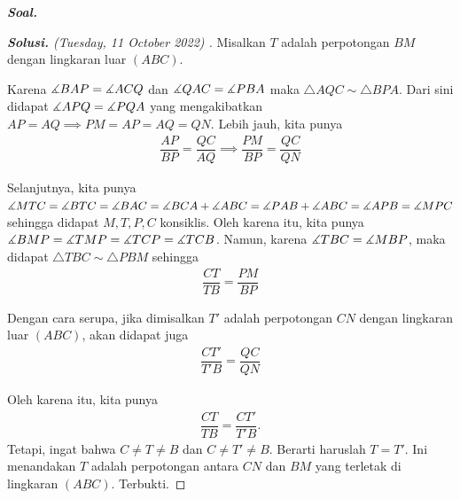 \textbf{\textit{Soal. }}

\begin{proof}[\textbf{Solusi. }(Tuesday, 11 October 2022) ]
Misalkan $T$ adalah perpotongan $BM$ dengan lingkaran luar $(ABC)$.
% 

Karena $\measuredangle BAP = \measuredangle ACQ$ dan $\measuredangle QAC = \measuredangle PBA$ maka $\triangle AQC \sim \triangle BPA$. Dari sini didapat $\measuredangle APQ = \measuredangle PQA$ yang mengakibatkan $AP=AQ \implies PM=AP=AQ=QN$. Lebih jauh, kita punya 
\begin{align*}
    \dfrac{AP}{BP} = \dfrac{QC}{AQ} \implies \dfrac{PM}{BP} = \dfrac{QC}{QN}
\end{align*}

Selanjutnya, kita punya $\measuredangle MTC = \measuredangle BTC = \measuredangle BAC = \measuredangle BCA + \measuredangle ABC = \measuredangle PAB + \measuredangle ABC = \measuredangle APB = \measuredangle MPC$ sehingga didapat $M,T,P,C$ konsiklis. Oleh karena itu, kita punya $\measuredangle BMP = \measuredangle TMP = \measuredangle TCP = \measuredangle TCB$. Namun, karena $\measuredangle TBC = \measuredangle MBP$, maka didapat $\triangle TBC \sim \triangle PBM$ sehingga
\begin{align*}
    \dfrac{CT}{TB} = \dfrac{PM}{BP}
\end{align*}

Dengan cara serupa, jika dimisalkan $T'$ adalah perpotongan $CN$  dengan lingkaran luar $(ABC)$,  akan didapat juga
\begin{align*}
    \dfrac{CT'}{T'B} = \dfrac{QC}{QN}
\end{align*}

Oleh karena itu, kita punya 
\begin{align*}
    \dfrac{CT}{TB} = \dfrac{CT'}{T'B}.
\end{align*}
Tetapi, ingat bahwa $C \neq T \neq B$ dan $C \neq T' \neq B$. Berarti haruslah $T=T'$. Ini menandakan $T$ adalah perpotongan antara $CN$ dan $BM$ yang terletak di lingkaran $(ABC)$. Terbukti.


\end{proof}